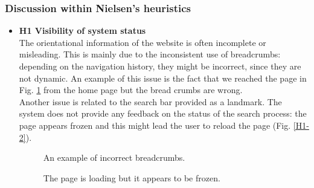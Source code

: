 \subsubsection{Discussion within Nielsen's heuristics}
\begin{itemize}
    \item \textbf{H1 Visibility of system status}\\
        The orientational information of the website is often incomplete or misleading. This is mainly due to the inconsistent use of breadcrumbs: depending on the navigation history, they might be incorrect, since they are not dynamic. An example of this issue is the fact that we reached the page in Fig. \ref{H1-1} from the home page but the bread crumbs are wrong.\\
        Another issue is related to the search bar provided as a landmark. The system does not provide any feedback on the status of the search process: the page appears frozen and this might lead the user to reload the page (Fig. \ref{H1-2}).\\
        \begin{figure}[!ht]
            \begin{minipage}{\linewidth}
                \centering
                \captionsetup{justification=centering}
                \caption{An example of incorrect breadcrumbs.}
                \label{H1-1}
            \end{minipage}
        \end{figure}
        \begin{figure}[!ht]
            \begin{minipage}{\linewidth}
                \centering
                \captionsetup{justification=centering}
                \caption{The page is loading but it appears to be frozen.}

\end{minipage}
\end{figure}
\end{itemize}
